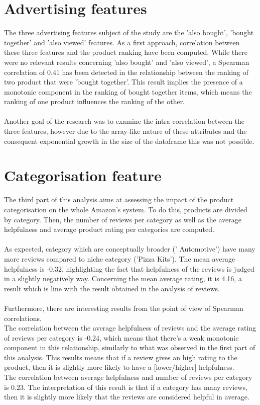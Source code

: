 \documentclass[11pt]{article}
\begin{document}
\section{Advertising features}
  The three advertising features subject of the study are the 'also bought', 'bought together' and 'also viewed' features. As a first approach, correlation between these three features and the product ranking have been computed. While there were no relevant results concerning 'also bought' and 'also viewed', a Spearman correlation of 0.41 has been detected in the relationship between the ranking of two product that were 'bought together'. This result implies the presence of a monotonic component in the ranking of bought together items, which means the ranking of one product influences the ranking of the other. \\\\
Another goal of the research was to examine the intra-correlation between the three features, however due to the array-like nature of these attributes and the consequent exponential growth in the size of the dataframe this was not possible.
\section{Categorisation feature}
The third part of this analysis aims at assessing the impact of the product categorisation on the whole Amazon's system. To do this, products are divided by category. Then, the number of reviews per category as well as the average helpfulness and average product rating per categories are computed.\\\\
As expected, category which are conceptually broader (' Automotive') have many more reviews compared to niche category ('Pizza Kits'). The mean average helpfulness is -0.32, highlighting the fact that helpfulness of the reviews is judged in a slightly negatively way. Concerning the mean average rating, it is 4.16, a result which is line with the result obtained in the analysis of reviews.\\\\
Furthermore, there are interesting results from the point of view of Spearman correlations.\\
The correlation between the average helpfulness of reviews and the average rating of reviews per category is -0.24, which means that there's a weak monotonic component in this relationship, similarly to what was observed in the first part of this analysis. This results means that if a review gives an high rating to the product, then it is slightly more likely to have a [lower/higher] helpfulness.  \\
The correlation between average helpfulness and number of reviews per category is 0.23. The interpretation of this result is that if a category has many reviews, then it is slightly more likely that the reviews are considered helpful in average.
\end{document}
